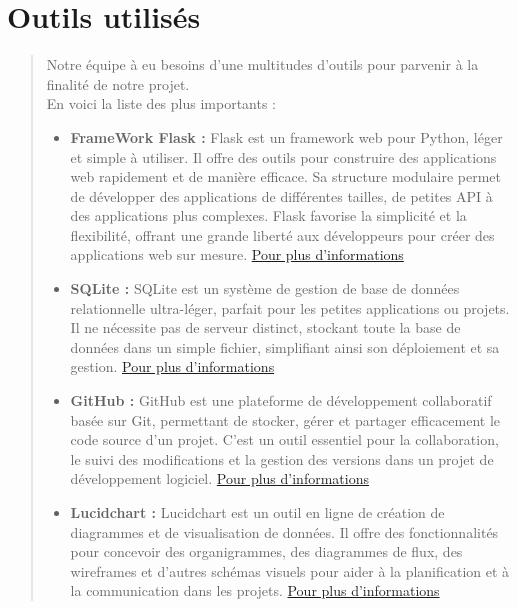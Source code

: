 \documentclass{article}
\begin{document}
\newpage
{}
\section*{Outils utilisés}

\begin{quote}
    Notre équipe à eu besoins d'une multitudes d'outils pour parvenir à la finalité de notre projet. \\

    En voici la liste des plus importants : 

    \begin{itemize}
        \item \textbf{FrameWork Flask :}  
        Flask est un framework web pour Python, léger et simple à utiliser. 
        Il offre des outils pour construire des applications web rapidement et de manière efficace. Sa structure modulaire permet de développer des applications de différentes tailles, de petites API à des applications plus complexes.
        Flask favorise la simplicité et la flexibilité, offrant une grande liberté aux développeurs pour créer des applications web sur mesure. \href{https://flask.palletsprojects.com/en/3.0.x/}{Pour plus d'informations}
        \vspace*{1\baselineskip}
        \item \textbf{SQLite : } 
        SQLite est un système de gestion de base de données relationnelle ultra-léger, parfait pour les petites applications ou projets. 
        Il ne nécessite pas de serveur distinct, stockant toute la base de données dans un simple fichier, simplifiant ainsi son déploiement et sa gestion. \href{https://www.sqlite.org/index.html}{Pour plus d'informations}
        \vspace*{1\baselineskip}
        \item \textbf{GitHub : } 
        GitHub est une plateforme de développement collaboratif basée sur Git, permettant de stocker, gérer et partager efficacement le code source d'un projet. 
        C'est un outil essentiel pour la collaboration, le suivi des modifications et la gestion des versions dans un projet de développement logiciel. \href{https://github.com/}{Pour plus d'informations}
        \vspace*{1\baselineskip}
        \item \textbf{Lucidchart  : } 
        Lucidchart est un outil en ligne de création de diagrammes et de visualisation de données. 
        Il offre des fonctionnalités pour concevoir des organigrammes, des diagrammes de flux, des wireframes et d'autres schémas visuels pour aider à la planification et à la communication dans les projets. \href{https://www.lucidchart.com/pages/fr/exemple/uml-online}{Pour plus d'informations}

\end{itemize}
\end{quote}
\end{document}
